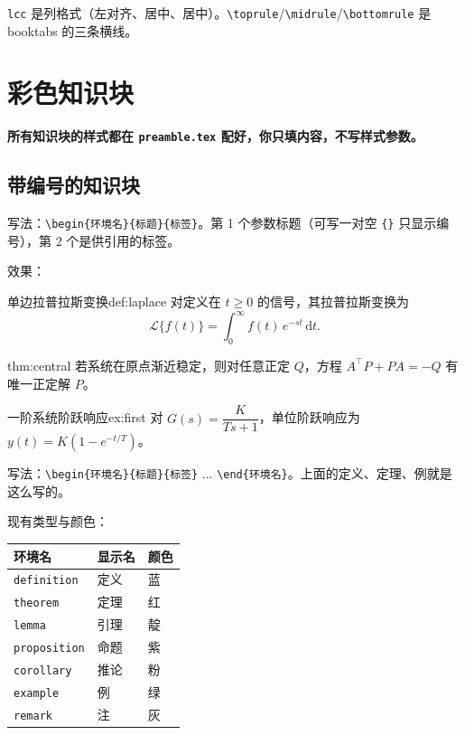 \texttt{lcc} 是列格式（左对齐、居中、居中）。\texttt{\textbackslash toprule}/\texttt{\textbackslash midrule}/\texttt{\textbackslash bottomrule} 是 booktabs 的三条横线。

\section{彩色知识块}

\textbf{所有知识块的样式都在 \texttt{preamble.tex} 配好，你只填内容，不写样式参数。}

\subsection{带编号的知识块}

写法：\texttt{\textbackslash begin\{环境名\}\{标题\}\{标签\}}。第 1 个参数标题（可写一对空 \texttt{\{\}} 只显示编号），第 2 个是供引用的标签。

效果：

\begin{definition}{单边拉普拉斯变换}{def:laplace}
对定义在 $t\ge 0$ 的信号，其拉普拉斯变换为
\begin{equation}
  \mathcal{L}\{f(t)\} = \int_0^\infty f(t)\,e^{-st}\,\mathrm{d}t .
\end{equation}
\end{definition}

\begin{theorem}{}{thm:central}
若系统在原点渐近稳定，则对任意正定 $Q$，方程 $A^{\top}P+PA=-Q$ 有唯一正定解 $P$。
\end{theorem}

\begin{example}{一阶系统阶跃响应}{ex:first}
对 $G(s)=\dfrac{K}{Ts+1}$，单位阶跃响应为 $y(t)=K(1-e^{-t/T})$。
\end{example}

写法：\texttt{\textbackslash begin\{环境名\}\{标题\}\{标签\}} ... \texttt{\textbackslash end\{环境名\}}。上面的定义、定理、例就是这么写的。

现有类型与颜色：

\begin{table}[htbp]
  \centering
  \begin{tabular}{lll}
    \toprule
    环境名 & 显示名 & 颜色 \\
    \midrule
    \texttt{definition} & 定义 & 蓝 \\
    \texttt{theorem}    & 定理 & 红 \\
    \texttt{lemma}      & 引理 & 靛 \\
    \texttt{proposition}& 命题 & 紫 \\
    \texttt{corollary}  & 推论 & 粉 \\
    \texttt{example}    & 例   & 绿 \\
    \texttt{remark}     & 注   & 灰 \\
    \bottomrule
  \end{tabular}
\end{table}

